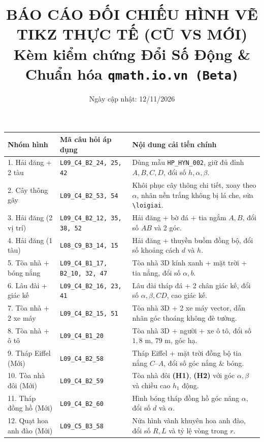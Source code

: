 \documentclass[10pt,a4paper]{article}
\title{\textbf{BÁO CÁO ĐỐI CHIẾU HÌNH VẼ TIKZ THỰC TẾ (CŨ VS MỚI)}\\ \large Kèm kiểm chứng Đổi Số Động \& Chuẩn hóa \texttt{qmath.io.vn (Beta)}}
\date{Ngày cập nhật: 12/11/2026}
\begin{document}
\maketitle
\thispagestyle{empty}

\begin{tcolorbox}[colback=blue!5!white,colframe=blue!65!black,title=\textbf{TÓM TẮT CÁC DẠNG ĐÃ NÂNG CẤP (21 MÃ) \& BỔ SUNG ĐA DẠNG (4 MÃ MỚI)}]
\small
\begin{tabular}{p{3.4cm} p{4.4cm} p{7.5cm}}
\textbf{Nhóm hình} & \textbf{Mã câu hỏi áp dụng} & \textbf{Nội dung cải tiến chính}\\
\hline
1. Hải đăng + 2 tàu & \texttt{L09\_C4\_B2\_24, 25, 42} & Dùng mẫu \texttt{HP\_HYN\_002}, giữ đủ đỉnh $A, B, C, D$, đổi số $h, \alpha, \beta$.\\
2. Cây thông gãy & \texttt{L09\_C4\_B2\_53, 54} & Khôi phục cây thông chi tiết, xoay theo $\alpha$, nhãn nền trắng không bị lá che, sửa \texttt{\textbackslash loigiai}.\\
3. Hải đăng (2 vị trí) & \texttt{L09\_C4\_B2\_12, 35, 38, 52} & Hải đăng + bờ đá + tia ngắm $A, B$, đổi số $AB$ và 2 góc.\\
4. Hải đăng (1 tàu) & \texttt{L08\_C9\_B3\_14, 15} & Hải đăng + thuyền buồm đồng bộ, đổi số khoảng cách $d$ và $h$.\\
5. Tòa nhà + bóng nắng & \texttt{L09\_C4\_B1\_17, B2\_10, 32, 47} & Tòa nhà 3D kính xanh + mặt trời + tia nắng, đổi số $\alpha, b$.\\
6. Lâu đài + giác kế & \texttt{L09\_C4\_B2\_16, 23, 41} & Lâu đài tháp đá + 2 chân giác kế, đổi số $\alpha, \beta, CD$, cao giác kế.\\
7. Tòa nhà + 2 xe máy & \texttt{L09\_C4\_B2\_15, 51} & Tòa nhà 3D + 2 xe máy vector, dẫn nhãn góc thoáng không đè tường.\\
8. Tòa nhà + ô tô & \texttt{L09\_C4\_B1\_20} & Tòa nhà 3D + người + xe ô tô, đổi số $1{,}8$ m, $79$ m, góc hạ.\\
\hline
9. Tháp Eiffel (Mới) & \texttt{L09\_C4\_B2\_58} & Tháp Eiffel + mặt trời đồng bộ tia nắng $C$--$A$, đổi số góc nắng \& bóng.\\
10. Tòa nhà đôi (Mới) & \texttt{L09\_C4\_B2\_59} & Tòa nhà đôi \textbf{(H1)}, \textbf{(H2)} với góc $\alpha, \beta$ và chiều cao $h_1$ động.\\
11. Tháp đồng hồ (Mới) & \texttt{L09\_C4\_B2\_60} & Hình bóng tháp đồng hồ góc nâng $\alpha$, đổi số $d$ và $\alpha$.\\
12. Quạt hoa anh đào (Mới) & \texttt{L09\_C5\_B3\_58} & Nửa hình vành khuyên hoa anh đào, đổi số $R, L$ và tỷ lệ vòng trong $r$.\\
\end{tabular}
\end{tcolorbox}
\end{document}
